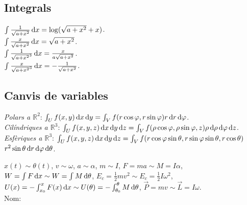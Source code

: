 \documentclass[10pt]{article}
\newcommand{\real}{\mathbb{R}}
\newcommand{\ci}{\textbullet\;}
\begin{document}
\ifland
\raggedright
\begin{multicols}{4}
\fi




\addtocounter{section}{1}
\noindent\makebox[\linewidth]{\rule{\linewidth}{0.5pt}}
\subsection{Integrals}
\ci $\int \frac{1}{\sqrt{a+x^2}}\dif x = \log (\sqrt{a+x^2} + x)$. \\
\ci $\int \frac{x}{\sqrt{a+x^2}}\dif x = \sqrt{a+x^2}$. \\
\ci $\int \frac{1}{\sqrt{a+x^2}^3}\dif x = \frac{x}{a\sqrt{a+x^2}}$. \\
\ci $\int \frac{x}{\sqrt{a+x^2}^3}\dif x = -\frac{1}{\sqrt{a+x^2}}$.

\subsection{Canvis de variables}
\emph{Polars a $\real^2$}: $\int_U f( x,y ) \dif x\dif y = \int_V f( r\cos\varphi, r\sin\varphi )r \dif r\dif \varphi$. \\
\emph{Cilíndriques a $\real^3$}: $\int_U f( x,y,z ) \dif x\dif y\dif z = \int_V f( \rho\cos\varphi, \rho\sin\varphi, z )\rho \dif \rho\dif \varphi\dif z$. \\
\emph{Esfèriques a $\real^3$}: $\int_U f( x,y,z ) \dif x\dif y\dif z = \int_V f ( r\cos\varphi\sin\theta, r\sin\varphi\sin\theta, r\cos\theta )$ $r^2\sin\theta \dif r\dif \varphi\dif \theta$.


\noindent\makebox[\linewidth]{\rule{\linewidth}{0.5pt}}
$x(t) \sim \theta(t)$, $v \sim \omega$, $a \sim \alpha$, $m \sim I$, $F = ma \sim M = I\alpha$, $W = \int F \dif x \sim W = \int M \dif \theta$, $E_c = \frac{1}{2}mv^2 \sim E_c = \frac{1}{2} I\omega^2$, $U(x) = -\int_{x_0}^x F(x) \dif x \sim U(\theta) = -\int_{\theta_0}^\theta M \dif \theta$, $\vec{P} = mv \sim \vec{L} = I\omega$. \\
\vspace{15pt}
\raggedleft
{\Large Nom: \underline{\hspace{5cm}}}

\ifland
\end{multicols}

\fi
\end{document}
